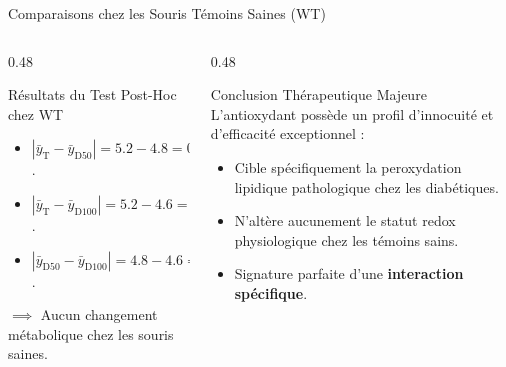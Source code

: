 \documentclass[aspectratio=169,10pt]{beamer}
\begin{document}
\begin{frame}{Comparaisons chez les Souris Témoins Saines (WT)}
  \begin{columns}[onlytextwidth, T]
    \begin{column}{0.48\linewidth}
      \begin{biobox}{Résultats du Test Post-Hoc chez WT}
        \small
        \begin{itemize}
          \item $|\bar{y}_{\text{T}} - \bar{y}_{\text{D50}}| = 5.2 - 4.8 = \mathbf{0.40} < 0.664 \implies \text{NS } (p > 0.05)$.
          \item $|\bar{y}_{\text{T}} - \bar{y}_{\text{D100}}| = 5.2 - 4.6 = \mathbf{0.60} < 0.664 \implies \text{NS } (p > 0.05)$.
          \item $|\bar{y}_{\text{D50}} - \bar{y}_{\text{D100}}| = 4.8 - 4.6 = \mathbf{0.20} < 0.664 \implies \text{NS } (p > 0.05)$.
        \end{itemize}
        $\implies$ Aucun changement métabolique chez les souris saines.
      \end{biobox}
    \end{column}
    \begin{column}{0.48\linewidth}
      \begin{takeawaybox}{Conclusion Thérapeutique Majeure}
        \small
        L'antioxydant possède un profil d'innocuité et d'efficacité exceptionnel :
        \begin{itemize}
          \item Cible spécifiquement la peroxydation lipidique pathologique chez les diabétiques.
          \item N'altère aucunement le statut redox physiologique chez les témoins sains.
          \item Signature parfaite d'une \textbf{interaction spécifique}.
        \end{itemize}
      \end{takeawaybox}
    \end{column}
  \end{columns}
\end{frame}
\end{document}
